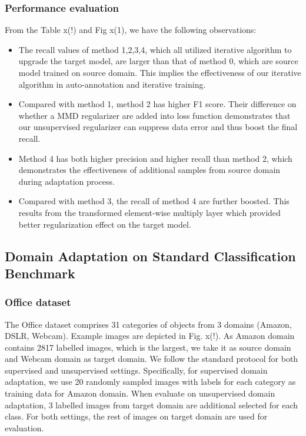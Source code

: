 \documentclass[runningheads]{llncs}
\begin{document}
\subsubsection{Performance evaluation}
From the Table x(!) and Fig x(1), we have the following observations:
\begin{itemize}
  \item The recall values of method 1,2,3,4, which all utilized iterative algorithm to upgrade the target model, are larger than that of method 0, which are source model trained on source domain. This implies the effectiveness of our iterative algorithm in auto-annotation and iterative training.
  \item Compared with method 1, method 2 has higher F1 score. Their difference on whether a MMD regularizer are added into loss function demonstrates that our unsupervised regularizer can suppress data error and thus boost the final recall.
  \item Method 4 has both higher precision and higher recall than method 2, which demonstrates the effectiveness of additional samples from source domain during adaptation process.
  \item Compared with method 3, the recall of method 4 are further boosted. This results from the transformed element-wise multiply layer which provided better regularization effect on the target model.
\end{itemize}



\subsection{Domain Adaptation on Standard Classification Benchmark}

\subsubsection{Office dataset}
The Office dataset \cite{saenko2010adapting} comprises 31 categories of objects from 3 domains (Amazon, DSLR, Webcam). Example images are depicted in Fig. x(!). As Amazon domain contains 2817 labelled images, which is the largest, we take it as source domain and Webcam domain as target domain. We follow the standard protocol for both supervised and unsupervised settings. Specifically, for supervised domain adaptation, we use 20 randomly sampled images with labels for each category as training data for Amazon domain. When evaluate on unsupervised domain adaptation, 3 labelled images from target domain are additional selected for each class. For both settings, the rest of images on target domain are used for evaluation.
\end{document}
